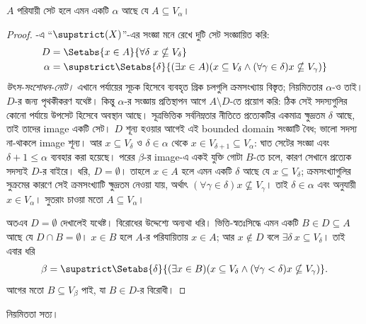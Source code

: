 \documentclass[../../../include/open-logic-section]{subfiles}
\begin{document}
\begin{lem}
$A$ পরিযায়ী সেট হলে এমন একটি $\alpha$ আছে
যে $A
\subseteq V_\alpha$।
\end{lem}

\begin{proof}
-এ
``$\supstrict(X)$''-এর সংজ্ঞা মনে রেখে দুটি
সেট সংজ্ঞায়িত করি:
\begin{align*}
	D  &= \Setabs{x \in A}{\forall \delta\ x \nsubseteq V_\delta}\\
	\alpha &= \supstrict\Setabs{\delta}{(\exists x \in A)
	(x \subseteq V_\delta \land (\forall \gamma \in \delta)x \nsubseteq V_\gamma)}
\end{align*}
\emph{উৎস-সংশোধন-নোট।} এখানে পর্যায়ের সূচক হিসেবে ব্যবহৃত
গ্রিক চলগুলি ক্রমসংখ্যায় বিস্তৃত; নিয়মিততার $\alpha$-ও তাই।
$D$-র জন্য পৃথকীকরণ যথেষ্ট। কিন্তু $\alpha$-র সংজ্ঞায়
প্রতিস্থাপন আগে $A\setminus D$-তে প্রয়োগ করি: ঠিক সেই সদস্যগুলির
কোনো পর্যায়ে উপসেট হিসেবে অবস্থান আছে। সূত্রভিত্তিক সর্বনিম্নতার
নীতিতে প্রত্যেকটির একমাত্র ক্ষুদ্রতম $\delta$ আছে, তাই তাদের
image একটি সেট। $D$ শূন্য হওয়ার আগেই এই bounded domain
সংজ্ঞাটি বৈধ; ভালো সদস্য না-থাকলে image শূন্য।
আর $x\subseteq V_\delta$ ও $\delta\in\alpha$ থেকে
$x\in V_{\delta+1}\subseteq V_\alpha$: ঘাত সেটের সংজ্ঞা
এবং $\delta+1\leq\alpha$ ব্যবহার করা হয়েছে। পরের $\beta$-র
image-এ একই যুক্তি গোটা $B$-তে চলে, কারণ সেখানে প্রত্যেক
সদস্যই $D$-র বাইরে।
ধরি, $D = \emptyset$। তাহলে $x \in A$ হলে
এমন একটি $\delta$ আছে যে $x \subseteq V_\delta$;
ক্রমসংখ্যাগুলির সুক্রমের কারণে সেই ক্রমসংখ্যাটি
ক্ষুদ্রতম নেওয়া যায়, অর্থাৎ
$(\forall \gamma \in \delta)x \nsubseteq V_\gamma$।
তাই $\delta \in \alpha$ এবং
অনুযায়ী $x \in V_\alpha$। সুতরাং চাওয়া মতো
$A \subseteq
V_{\alpha}$।

অতএব $D = \emptyset$ দেখালেই যথেষ্ট। বিরোধের
উদ্দেশ্যে অন্যথা ধরি। ভিত্তি-স্বতঃসিদ্ধে
এমন একটি $B \in D \subseteq A$ আছে যে
$D \cap B
= \emptyset$। $x \in B$ হলে $A$-র পরিযায়িতায়
$x \in A$; আর $x \notin D$ বলে
$\exists \delta\ x \subseteq
V_\delta$। তাই এবার ধরি
\[
	\beta = \supstrict\Setabs{\delta}{(\exists x \in B)(x \subseteq V_\delta \land (\forall \gamma < \delta)x \nsubseteq V_\gamma)}.
\]
আগের মতো $B \subseteq V_\beta$ পাই, যা
$B \in
D$-র বিরোধী।
\end{proof}

\begin{thm}
নিয়মিততা সত্য।
\end{thm}
\end{document}
